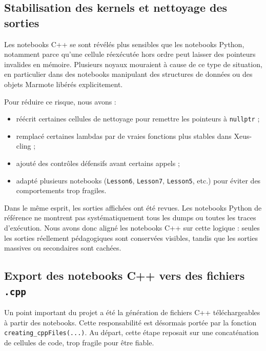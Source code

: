 \documentclass[a4paper,12pt,twoside]{article}
\begin{document}
\subsection{Stabilisation des kernels et nettoyage des sorties}

Les notebooks C++ se sont révélés plus sensibles que les notebooks Python, notamment parce qu'une cellule réexécutée hors ordre peut laisser des pointeurs invalides en mémoire. Plusieurs noyaux mouraient à cause de ce type de situation, en particulier dans des notebooks manipulant des structures de données ou des objets Marmote libérés explicitement.

Pour réduire ce risque, nous avons :
\begin{itemize}
    \item réécrit certaines cellules de nettoyage pour remettre les pointeurs à \texttt{nullptr} ;
    \item remplacé certaines lambdas par de vraies fonctions plus stables dans Xeus-cling ;
    \item ajouté des contrôles défensifs avant certains appels ;
    \item adapté plusieurs notebooks (\texttt{Lesson6}, \texttt{Lesson7}, \texttt{Lesson5}, etc.) pour éviter des comportements trop fragiles.
\end{itemize}

Dans le même esprit, les sorties affichées ont été revues. Les notebooks Python de référence ne montrent pas systématiquement tous les dumps ou toutes les traces d'exécution. Nous avons donc aligné les notebooks C++ sur cette logique : seules les sorties réellement pédagogiques sont conservées visibles, tandis que les sorties massives ou secondaires sont cachées.

\subsection{Export des notebooks C++ vers des fichiers \texttt{.cpp}}

Un point important du projet a été la génération de fichiers C++ téléchargeables à partir des notebooks. Cette responsabilité est désormais portée par la fonction \texttt{creating\_cppFiles(...)}. Au départ, cette étape reposait sur une concaténation de cellules de code, trop fragile pour être fiable.
\end{document}
